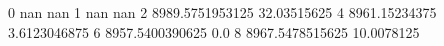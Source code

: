 0 nan nan
1 nan nan
2 8989.5751953125 32.03515625
4 8961.15234375 3.6123046875
6 8957.5400390625 0.0
8 8967.5478515625 10.0078125
